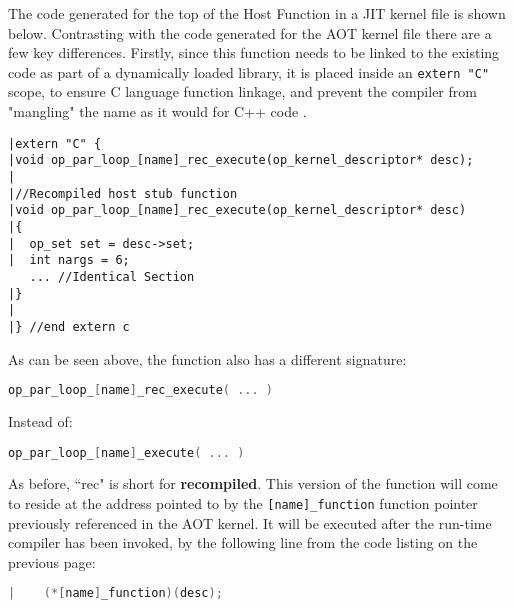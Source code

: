 The code generated for the top of the Host Function in a JIT kernel file is shown below. Contrasting with the code generated for the AOT kernel file there are a few key differences. Firstly, since this function needs to be linked to the existing code as part of a dynamically loaded library, it is placed inside an \verb|extern "C"| scope, to ensure C language function linkage, and prevent the compiler from "mangling" the name as it would for C++ code \cite{linkage}.

\begin{lstlisting}[linewidth = \textwidth, framesep=0pt, linebackgroundcolor={\ifnum\value{lstnumber}<11 \ifnum\value{lstnumber}>6 \color{red!20} \else \color{green!20} \fi \else \color{green!20} \fi}]
|extern "C" {
|void op_par_loop_[name]_rec_execute(op_kernel_descriptor* desc);
|
|//Recompiled host stub function
|void op_par_loop_[name]_rec_execute(op_kernel_descriptor* desc)
|{
|  op_set set = desc->set;
|  int nargs = 6;
   ... //Identical Section
|}
|
|} //end extern c
\end{lstlisting}


\noindent As can be seen above, the function also has a different signature:\vspace{1em}
\begin{lstlisting}[backgroundcolor=\color{green!20}, language=C]
op_par_loop_[name]_rec_execute( ... )
\end{lstlisting}
\vspace{-1em}
Instead of:
\vspace{.5em}
\begin{lstlisting}[backgroundcolor=\color{blue!20}, language=C]
op_par_loop_[name]_execute( ... )
\end{lstlisting}
As before, ``rec" is short for \textbf{recompiled}. This version of the function will come to reside at the address pointed to by the \verb|[name]_function| function pointer previously referenced in the AOT kernel. It will be executed after the run-time compiler has been invoked, by the following line from the code listing on the previous page:

\begin{lstlisting}[backgroundcolor=\color{blue!20}, language=C]
|    (*[name]_function)(desc);
\end{lstlisting}

